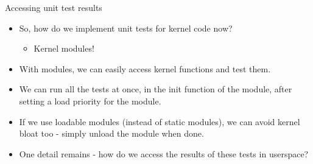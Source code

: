 \documentclass{beamer}
\begin{document}
\begin{frame}{Accessing unit test results}

  \begin{itemize}
    \item So, how do we implement unit tests for kernel code now?
      \begin{itemize}
      \item Kernel modules!
      \end{itemize}
    \item With modules, we can easily access kernel functions and test
      them.
    \item We can run all the tests at once, in the init function of
      the module, after setting a load priority for the module.
    \item If we use loadable modules (instead of static modules), we
      can avoid kernel bloat too - simply unload the module when done.
    \item One detail remains - how do we access the results of these
      tests in userspace?
  \end{itemize}

\end{frame}
\end{document}
